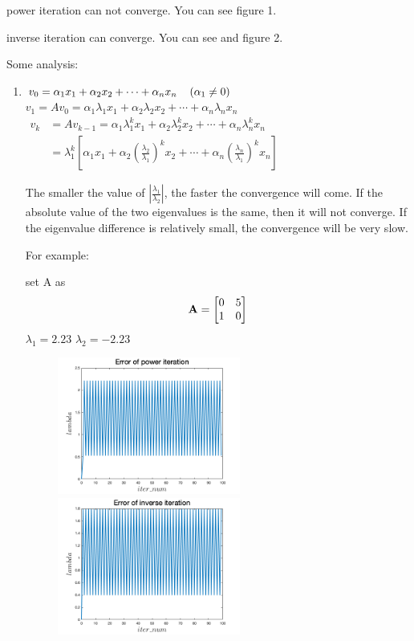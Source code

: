 \documentclass[english,onecolumn]{IEEEtran}
\newcommand{\bA}{{\bf A}}
\begin{document}
\begin{enumerate}
power iteration can not converge. You can see figure 1.

inverse iteration can converge. You can see and figure 2.

Some analysis:
\begin{enumerate}
	\item $
	v_{0}=\alpha_{1} x_{1}+\alpha_{2} x_{2}+\cdots+\alpha_{n} x_{n} \quad\left(\alpha_{1} \neq 0\right) \\$
	$
	v_{1}=A v_{0}=\alpha_{1} \lambda_{1} x_{1}+\alpha_{2} \lambda_{2} x_{2}+\cdots+\alpha_{n} \lambda_{n} x_{n}$\\
	$
	\begin{aligned}
		v_{k} &=A v_{k-1}=\alpha_{1} \lambda_{1}^{k} x_{1}+\alpha_{2} \lambda_{2}^{k} x_{2}+\cdots+\alpha_{n} \lambda_{n}^{k} x_{n} \\
		&=\lambda_{1}^{k}\left[\alpha_{1} x_{1}+\alpha_{2}\left(\frac{\lambda_{2}}{\lambda_{1}}\right)^{k} x_{2}+\cdots+\alpha_{n}\left(\frac{\lambda_{n}}{\lambda_{1}}\right)^{k} x_{n}\right]
	\end{aligned}
	$
	
	
	The smaller the value of $|\frac{\lambda_1}{\lambda_2}|$, the faster the convergence will come. If the absolute value of the two eigenvalues is the same, then it will not converge. If the eigenvalue difference is relatively small, the convergence will be very slow.
	
	For example:
	
	set A as \[
	\bA = \begin{bmatrix}
		0 & 5 \\
		1 & 0
	\end{bmatrix}
	\]
	$\lambda_1 = 2.23$ $\lambda_2 = -2.23$ 
	\begin{figure}[htbp]
		\centering
		\begin{minipage}[t]{0.48\textwidth}
			\centering
			\includegraphics[width=6cm]{code/power_iter_not}
		\end{minipage}
		\begin{minipage}[t]{0.48\textwidth}
			\centering
			\includegraphics[width=6cm]{code/inv_iter_not}
		\end{minipage}
	\end{figure}
	

\end{enumerate}
\end{enumerate}
\end{document}
